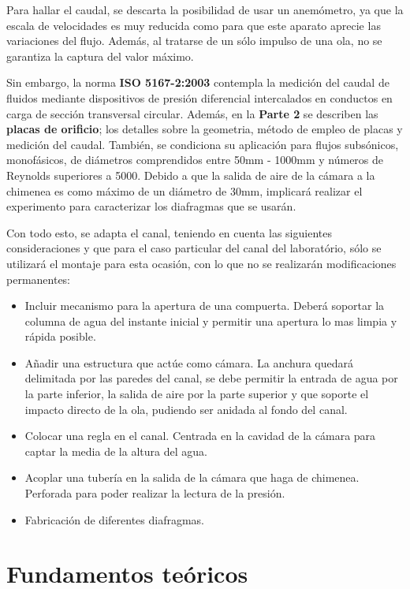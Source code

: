 Para hallar el caudal, se descarta la posibilidad de usar un anemómetro,
ya que la escala de velocidades es muy reducida como para que este
aparato aprecie las variaciones del flujo. Además, al tratarse de un
sólo impulso de una ola, no se garantiza la captura del valor máximo.

Sin embargo, la norma \textbf{ISO 5167-2:2003} contempla la medición del
caudal de fluidos mediante dispositivos de presión diferencial
intercalados en conductos en carga de sección transversal circular.
Además, en la \textbf{Parte 2} se describen las \textbf{placas de
orificio}; los detalles sobre la geometria, método de empleo de placas y
medición del caudal. También, se condiciona su aplicación para flujos
subsónicos, monofásicos, de diámetros comprendidos entre 50mm - 1000mm y
números de Reynolds superiores a 5000. Debido a que la salida de aire de
la cámara a la chimenea es como máximo de un diámetro de 30mm, implicará
realizar el experimento para caracterizar los diafragmas que se usarán.

Con todo esto, se adapta el canal, teniendo en cuenta las siguientes
consideraciones y que para el caso particular del canal del laboratório,
sólo se utilizará el montaje para esta ocasión, con lo que no se
realizarán modificaciones permanentes:

\begin{itemize}
\item
  Incluir mecanismo para la apertura de una compuerta. Deberá soportar
  la columna de agua del instante inicial y permitir una apertura lo mas
  limpia y rápida posible.
\item
  Añadir una estructura que actúe como cámara. La anchura quedará
  delimitada por las paredes del canal, se debe permitir la entrada de
  agua por la parte inferior, la salida de aire por la parte superior y
  que soporte el impacto directo de la ola, pudiendo ser anidada al
  fondo del canal.
\item
  Colocar una regla en el canal. Centrada en la cavidad de la cámara
  para captar la media de la altura del agua.
\item
  Acoplar una tubería en la salida de la cámara que haga de chimenea.
  Perforada para poder realizar la lectura de la presión.
\item
  Fabricación de diferentes diafragmas.
\end{itemize}

\section{Fundamentos teóricos}\label{header-n45}

